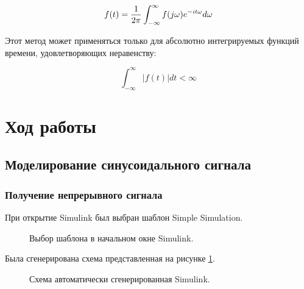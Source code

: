 \documentclass[a4paper,14pt]{extarticle}
\begin{document}
\begin{equation}
f(t) = {{1}\over{2\pi}} \int_{-\infty}^{\infty} f(j\omega) e^{-it\omega} d\omega
\end{equation}

Этот метод может применяться только для абсолютно интегрируемых функций времени, удовлетворяющих неравенству:

\begin{equation}
\int_{-\infty}^{\infty} |f(t)| dt < \infty
\end{equation}

\section{Ход работы}

\subsection{Моделирование синусоидального сигнала}

\subsubsection{Получение непрерывного сигнала}

При открытие Simulink был выбран шаблон Simple Simulation.

\begin{figure}[H]
\caption{Выбор шаблона в начальном окне Simulink.}
\end{figure}

\newpage

Была сгенерирована схема представленная на рисунке \ref{001}.

\begin{figure}[H]
\caption{Схема автоматически сгенерированная Simulink.}
\label{001}
\end{figure}
\end{document}
